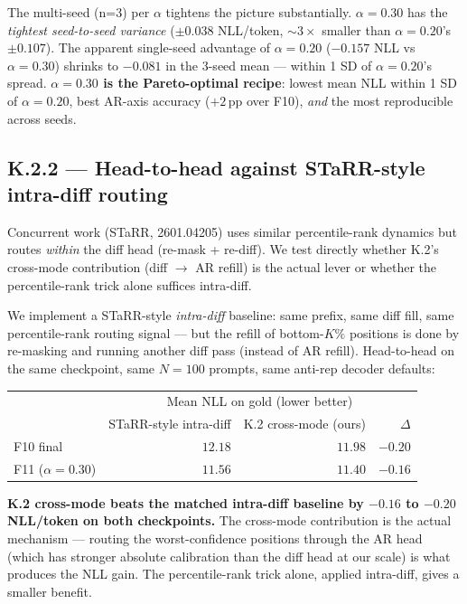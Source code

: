 The multi-seed (n=3) per $\alpha$ tightens the picture substantially.
$\alpha=0.30$ has the \emph{tightest seed-to-seed variance}
($\pm 0.038$ NLL/token, $\sim 3\times$ smaller than $\alpha=0.20$'s
$\pm 0.107$). The apparent single-seed advantage of $\alpha=0.20$
($-0.157$ NLL vs $\alpha=0.30$) shrinks to $-0.081$ in the
3-seed mean — within 1 SD of $\alpha=0.20$'s spread.
\textbf{$\alpha=0.30$ is the Pareto-optimal recipe}: lowest mean
NLL within 1 SD of $\alpha=0.20$, best AR-axis accuracy
($+2$\,pp over F10), \emph{and} the most reproducible across seeds.

\subsection{K.2.2 — Head-to-head against STaRR-style intra-diff routing}
\label{sec:k22}

Concurrent work \citep{starr2026} (STaRR, 2601.04205) uses similar
percentile-rank dynamics but routes \emph{within} the diff head
(re-mask + re-diff). We test directly whether K.2's cross-mode
contribution (diff $\to$ AR refill) is the actual lever or whether the
percentile-rank trick alone suffices intra-diff.

We implement a STaRR-style \emph{intra-diff} baseline: same prefix,
same diff fill, same percentile-rank routing signal --- but the
refill of bottom-$K\%$ positions is done by re-masking and running
another diff pass (instead of AR refill). Head-to-head on the same
checkpoint, same $N=100$ prompts, same anti-rep decoder defaults:

\begin{center}
\begin{tabular}{lrrr}
\toprule
& \multicolumn{3}{c}{Mean NLL on gold (lower better)} \\
& STaRR-style intra-diff & K.2 cross-mode (ours) & $\Delta$ \\
\midrule
F10 final & $12.18$ & $11.98$ & $-0.20$ \\
F11 ($\alpha=0.30$) & $11.56$ & $11.40$ & $-0.16$ \\
\bottomrule
\end{tabular}
\end{center}

\textbf{K.2 cross-mode beats the matched intra-diff baseline by
$-0.16$ to $-0.20$ NLL/token on both checkpoints.} The cross-mode
contribution is the actual mechanism --- routing the worst-confidence
positions through the AR head (which has stronger absolute
calibration than the diff head at our scale) is what produces the
NLL gain. The percentile-rank trick alone, applied intra-diff, gives
a smaller benefit.

